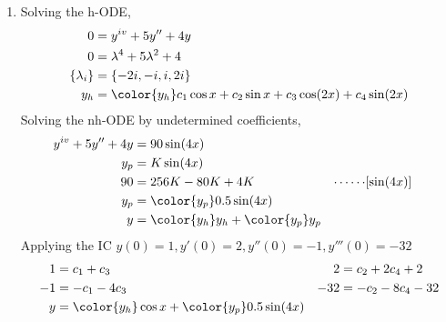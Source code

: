 \begin{enumerate}
    \item Solving the h-ODE,
          \begin{align}
              0               & = y^{iv} + 5y'' + 4y                  \\
              0               & = \lambda^{4} + 5\lambda^{2} + 4      \\
              \{\lambda_{i}\} & = \{-2i, -i, i, 2i\}                  \\
              y_{h}           & = \color{y_h} c_1 \cos x + c_2 \sin x
              + c_3 \cos(2x) + c_4 \sin(2x)
          \end{align}
          Solving the nh-ODE by undetermined coefficients,
          \begin{align}
              y^{iv} + 5y'' + 4y & = 90\sin(4x)                                  \\
              y_{p}              & = K\sin(4x)                                   \\
              90                 & = 256K - 80K + 4K                           &
              \cdots\cdots       & [\sin(4x)]                                    \\
              y_{p}              & = \color{y_p} 0.5\sin(4x)                     \\
              y                  & = {\color{y_h} y_{h}} + {\color{y_p} y_{p}}
          \end{align}
          Applying the IC $ y(0) = 1, y'(0) = 2, y''(0) = -1, y'''(0) = -32 $
          \begin{align}
              1   & = c_1 + c_3                                        &
              2   & = c_2 + 2c_4 + 2                                     \\
              -1  & = -c_1 - 4c_3                                      &
              -32 & = -c_2 - 8c_4 - 32                                   \\
              y   & = {\color{y_h} \cos x} + {\color{y_p} 0.5\sin(4x)}
          \end{align}
          \begin{figure}[H]
              \centering
          \end{figure}


\end{enumerate}
